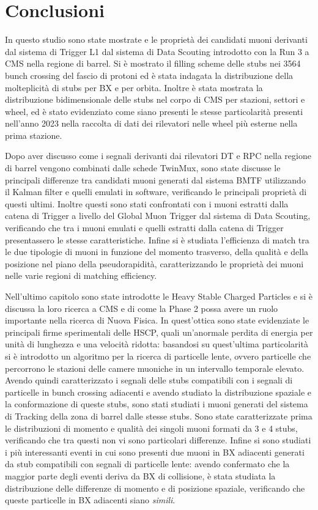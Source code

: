 \chapter{Conclusioni}
\label{cap:Conclusioni}

In questo studio sono state mostrate e le proprietà dei candidati muoni derivanti dal sistema di Trigger L1 dal sistema di Data Scouting introdotto con la Run 3 a CMS nella regione di barrel. Si è mostrato il filling scheme delle stubs nei 3564 bunch crossing del fascio di protoni ed è stata indagata la distribuzione della molteplicità di stubs per BX e per orbita. Inoltre è stata mostrata la distribuzione bidimensionale delle stubs nel corpo di CMS per stazioni, settori e wheel, ed è stato evidenziato come siano presenti le stesse particolarità presenti nell'anno 2023 nella raccolta di dati dei rilevatori nelle wheel più esterne nella prima stazione.

Dopo aver discusso come i segnali derivanti dai rilevatori DT e RPC nella regione di barrel vengono combinati dalle schede TwinMux, sono state discusse le principali differenze tra candidati muoni generati dal sistema BMTF utilizzando il Kalman filter e quelli emulati in software, verificando le principali proprietà di questi ultimi. Inoltre questi sono stati confrontati con i muoni estratti dalla catena di Trigger a livello del Global Muon Trigger dal sistema di Data Scouting, verificando che tra i muoni emulati e quelli estratti dalla catena di Trigger presentassero le stesse caratteristiche. Infine si è studiata l'efficienza di match tra le due tipologie di muoni in funzione del momento trasverso, della qualità e della posizione nel piano della pseudorapidità, caratterizzando le proprietà dei muoni nelle varie regioni di matching efficiency. 


Nell'ultimo capitolo sono state introdotte le Heavy Stable Charged Particles e si è discussa la loro ricerca a CMS e di come la Phase 2 possa avere un ruolo importante nella ricerca di Nuova Fisica. In quest'ottica sono state evidenziate le principali firme sperimentali delle HSCP, quali un'anormale perdita di energia per unità di lunghezza e una velocità ridotta: basandosi su quest'ultima particolarità si è introdotto un algoritmo per la ricerca di particelle lente, ovvero particelle che percorrono le stazioni delle camere muoniche in un intervallo temporale elevato.\newline
Avendo quindi caratterizzato i segnali delle stubs compatibili con i segnali di particelle in bunch crossing adiacenti e avendo studiato la distribuzione spaziale e la conformazione di queste stubs, sono stati studiati i muoni generati del sistema di Tracking della zona di barrel dalle stesse stubs.
Sono state caratterizzate prima le distribuzioni di momento e qualità dei singoli muoni formati da 3 e 4 stubs, verificando che tra questi non vi sono particolari differenze. Infine si sono studiati i più interessanti eventi in cui sono presenti due muoni in BX adiacenti generati da stub compatibili con segnali di particelle lente: avendo confermato che la maggior parte degli eventi deriva da BX di collisione, è stata studiata la distribuzione delle differenze di momento e di posizione spaziale, verificando che queste particelle in BX adiacenti siano \textit{simili}. 